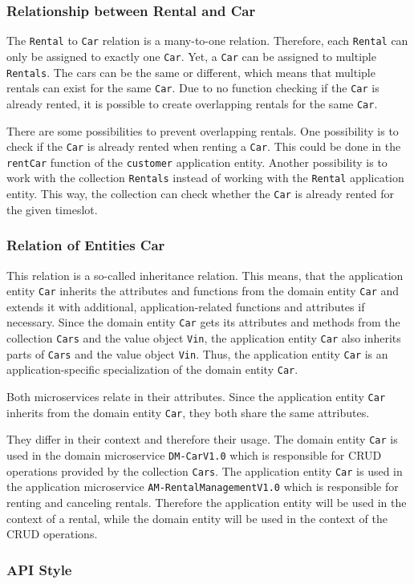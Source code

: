 \subsubsection*{Relationship between Rental and Car}
The \texttt{Rental} to \texttt{Car} relation is a many-to-one relation.
Therefore, each \texttt{Rental} can only be assigned to exactly one \texttt{Car}.
Yet, a \texttt{Car} can be assigned to multiple \texttt{Rentals}.
The cars can be the same or different, which means that multiple rentals can exist for the same \texttt{Car}.
Due to no function checking if the \texttt{Car} is already rented, it is possible to create overlapping rentals for the same \texttt{Car}.

There are some possibilities to prevent overlapping rentals.
One possibility is to check if the \texttt{Car} is already rented when renting a \texttt{Car}.
This could be done in the \texttt{rentCar} function of the \texttt{customer} application entity.
Another possibility is to work with the collection \texttt{Rentals} instead of working with the \texttt{Rental} application entity.
This way, the collection can check whether the \texttt{Car} is already rented for the given timeslot.

\subsubsection*{Relation of Entities Car}
This relation is a so-called inheritance relation.
This means, that the application entity \texttt{Car} inherits the attributes and functions from the domain entity \texttt{Car} and extends it with additional, application-related functions and attributes if necessary.
Since the domain entity \texttt{Car} gets its attributes and methods from the collection \texttt{Cars} and the value object \texttt{Vin}, the application entity \texttt{Car} also inherits parts of \texttt{Cars} and the value object \texttt{Vin}.
Thus, the application entity \texttt{Car} is an application-specific specialization of the domain entity \texttt{Car}.

Both microservices relate in their attributes.
Since the application entity \texttt{Car} inherits from the domain entity \texttt{Car}, they both share the same attributes.

They differ in their context and therefore their usage.
The domain entity \texttt{Car} is used in the domain microservice \texttt{DM-CarV1.0} which is responsible for CRUD operations provided by the collection \texttt{Cars}.
The application entity \texttt{Car} is used in the application microservice \texttt{AM-RentalManagementV1.0} which is responsible for renting and canceling rentals.
Therefore the application entity will be used in the context of a rental, while the domain entity will be used in the context of the CRUD operations.

\subsubsection*{API Style}

